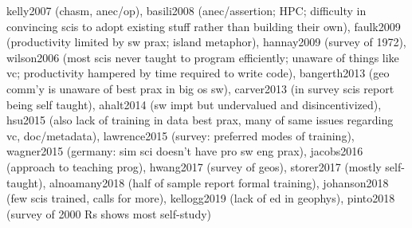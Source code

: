 \documentclass[12pt]{amsart}
\begin{document}
kelly2007 (chasm, anec/op), basili2008 (anec/assertion; HPC; difficulty in convincing scis to adopt existing stuff rather than building their own), faulk2009 (productivity limited by sw prax; island metaphor), hannay2009 (survey of 1972), wilson2006 (most scis never taught to program efficiently; unaware of things like vc; productivity hampered by time required to write code), bangerth2013 (geo comm'y is unaware of best prax in big os sw), carver2013 (in survey scis report being self taught), ahalt2014 (sw impt but undervalued and disincentivized), hsu2015 (also lack of training in data best prax, many of same issues regarding vc, doc/metadata), lawrence2015 (survey: preferred modes of training), wagner2015 (germany: sim sci doesn't have pro sw eng prax), jacobs2016 (approach to teaching prog), hwang2017 (survey of geos), storer2017 (mostly self-taught), alnoamany2018 (half of sample report formal training), johanson2018 (few scis trained, calls for more), kellogg2019 (lack of ed in geophys), pinto2018 (survey of 2000 Rs shows most self-study)
\end{document}

